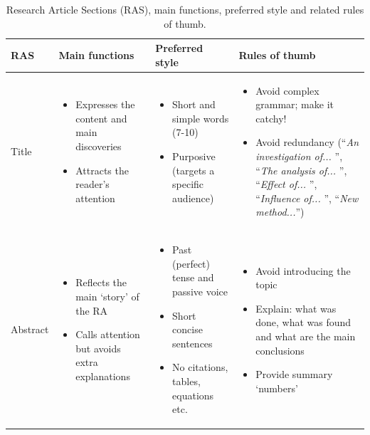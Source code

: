 \documentclass[graybox,envcountchap,sectrefs,UStrade]{svmono}
\begin{document}
{\small
\begin{table} \addtolength{\tabcolsep}{4pt}
\centering \caption{Research Article Sections (RAS), main functions, preferred style and related rules of thumb.}\label{Tbl:functions}
\begin{tabular}{m{}m{}m{}m{}}
\toprule
RAS & Main functions & Preferred style & Rules of thumb \\
\midrule
Title & \begin{itemize}  \item Expresses the content and main discoveries \item Attracts the reader's attention \end{itemize} & \begin{itemize} \item Short and simple words (7-10) \item Purposive (targets a specific audience) \end{itemize} & \begin{itemize} \item Avoid complex grammar; make it catchy! \item Avoid redundancy (``\emph{An investigation of... }'', ``\emph{The analysis of... }'', ``\emph{Effect of... }'', ``\emph{Influence of... }'', ``\emph{New method...}'') \end{itemize} \\
Abstract & \begin{itemize} \item Reflects the main `story' of the RA \item Calls attention but avoids extra explanations \end{itemize} & \begin{itemize} \item Past (perfect) tense and passive voice \item Short concise sentences \item No citations, tables, equations etc. \end{itemize} & \begin{itemize} \item Avoid introducing the topic \item Explain: what was done, what was found and what are the main conclusions \item Provide summary `numbers' \end{itemize} \\

\end{tabular}
\end{table}}
\end{document}
